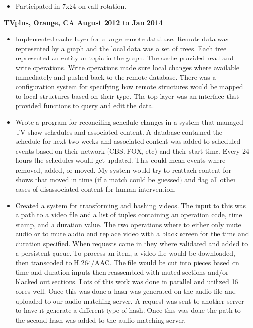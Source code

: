 \documentclass{res}
\begin{document}
\begin{resume}
\begin{itemize}
\item

    	Participated in 7x24 on-call rotation.

\end{itemize}

{\large \bf TVplus, Orange, CA \hfill August 2012 to Jan 2014}

\begin{itemize}

\item
	Implemented cache layer for a large remote database.  Remote
	data was represented by a graph and the local data was a
	set of trees.  Each tree represented an entity or topic in
	the graph.  The cache provided read and write operations.  Write
	operations made sure local changes where available immediately and
	pushed back to the remote database.  There was a configuration
	system for specifying how remote structures would be mapped
	to local structures based on their type.  The top layer was an
	interface that provided functions to query and edit the data.

\item
	Wrote a program for reconciling schedule changes in a system
	that managed TV show schedules and associated content.	A database
	contained the schedule for next two weeks and associated content
	was added to scheduled events based on their network (CBS, FOX,
	etc) and their start time.  Every 24 hours the schedules would
	get updated.  This could mean events where removed, added,
	or moved.  My system would try to reattach content for shows
	that moved in time (if a match could be guessed) and flag all
	other cases of disassociated content for human intervention.
\item
	Created a system for transforming and hashing videos.  The
	input to this was a path to a video file and a list of tuples
	containing an operation code, time stamp, and a duration value.
	The two operations where to either only mute audio or to mute
	audio and replace video with a black screen for the time and
	duration specified.  When requests came in they where validated
	and added to a persistent queue.  To process an item, a video
	file would be downloaded, then transcoded to H.264/AAC.  The file
	would be cut into pieces based on time and duration inputs then
	reassembled with muted sections and/or blacked out sections.
	Lots of this work was done in parallel and utilized 16 cores well.
	Once this was done a hash was generated on the audio file and
	uploaded to our audio matching server.	A request was sent to
	another server to have it generate a different type of hash.
	Once this was done the path to the second hash was added to the
	audio matching server.


\end{itemize}
\end{resume}
\end{document}
